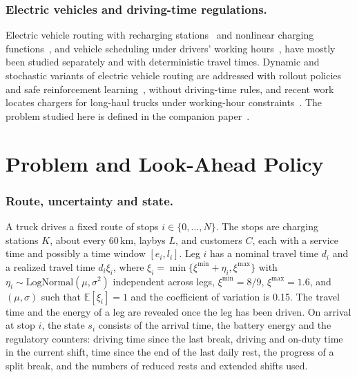 \documentclass[runningheads]{llncs}
\begin{document}
\subsubsection{Electric vehicles and driving-time regulations.}
Electric vehicle routing with recharging stations~\cite{schneider2014} and
nonlinear charging functions~\cite{montoya2017}, and vehicle scheduling under
drivers' working hours~\cite{goel2009,goel_vidal2014}, have mostly been
studied separately and with deterministic travel times. Dynamic and
stochastic variants of electric vehicle routing are addressed with rollout
policies~\cite{kullman2021} and safe reinforcement learning~\cite{basso2022},
without driving-time rules, and recent work locates chargers for long-haul
trucks under working-hour constraints~\cite{vidotteplaza2026}. The problem
studied here is defined in the companion paper~\cite{pagnier_bakker_journal}.

\section{Problem and Look-Ahead Policy}
\label{sec:problem}

\subsubsection{Route, uncertainty and state.}
A truck drives a fixed route of stops $i\in\{0,\dots,N\}$. The stops are
charging stations $K$, about every 60\,km, laybys $L$, and customers $C$, each
with a service time and possibly a time window $[e_i,l_i]$. Leg $i$ has a
nominal travel time $d_i$ and a realized travel time $d_i\xi_i$, where
$\xi_i=\min\{\xi^{\min}+\eta_i,\xi^{\max}\}$ with
$\eta_i\sim\mathrm{LogNormal}(\mu,\sigma^2)$ independent across legs,
$\xi^{\min}=8/9$, $\xi^{\max}=1.6$, and $(\mu,\sigma)$ such that
$\mathbb{E}[\xi_i]=1$ and the coefficient of variation is 0.15. The travel
time and the energy of a leg are revealed once the leg has been driven. On
arrival at stop $i$, the state $s_i$ consists of the arrival time, the battery
energy and the regulatory counters: driving time since the last break, driving
and on-duty time in the current shift, time since the end of the last daily
rest, the progress of a split break, and the numbers of reduced rests and
extended shifts used.
\end{document}
